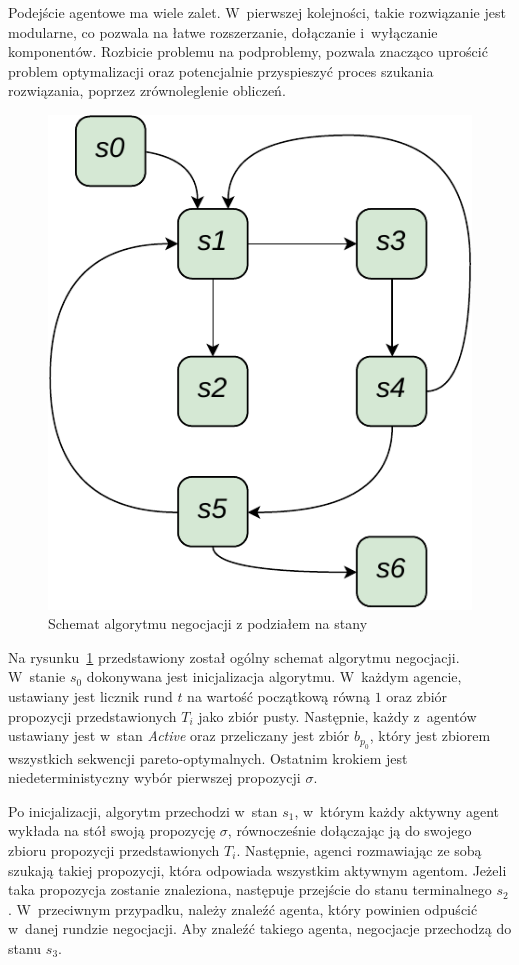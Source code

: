 Podejście agentowe ma wiele zalet. W~pierwszej kolejności, takie rozwiązanie jest modularne, co pozwala na łatwe rozszerzanie, dołączanie i~wyłączanie komponentów. Rozbicie problemu na podproblemy, pozwala znacząco uprościć problem optymalizacji oraz potencjalnie przyspieszyć proces szukania rozwiązania, poprzez zrównoleglenie obliczeń.

\begin{figure}
    \centering
    \includegraphics[width=0.8\columnwidth]{figures/SAG-Negotiation.pdf}
    \caption{Schemat algorytmu negocjacji z podziałem na stany}
    \label{fig:abstract-negotiation-fsm}
\end{figure}

Na rysunku~\ref{fig:abstract-negotiation-fsm} przedstawiony został ogólny schemat algorytmu negocjacji. W~stanie $s_{0}$ dokonywana jest inicjalizacja algorytmu. W~każdym agencie, ustawiany jest licznik rund $t$ na wartość początkową równą $1$ oraz zbiór propozycji przedstawionych $T_{i}$ jako zbiór pusty. Następnie, każdy z~agentów ustawiany jest w~stan \textit{Active} oraz przeliczany jest zbiór $b_{p_{0}}$, który jest zbiorem wszystkich sekwencji pareto-optymalnych. Ostatnim krokiem jest niedeterministyczny wybór pierwszej propozycji $\sigma$.

Po inicjalizacji, algorytm przechodzi w~stan $s_{1}$, w~którym każdy aktywny agent wykłada na stół swoją propozycję $\sigma$, równocześnie dołączając ją do swojego zbioru propozycji przedstawionych $T_{i}$. Następnie, agenci rozmawiając ze sobą szukają takiej propozycji, która odpowiada wszystkim aktywnym agentom. Jeżeli taka propozycja zostanie znaleziona, następuje przejście do stanu terminalnego $s_{2}$. W~przeciwnym przypadku, należy znaleźć agenta, który powinien odpuścić w~danej rundzie negocjacji. Aby znaleźć takiego agenta, negocjacje przechodzą do stanu $s_{3}$.


